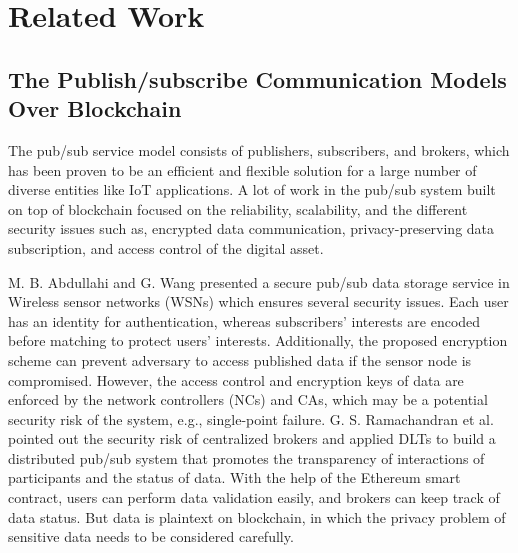 \newpage
{}
\chapter{Related Work}
\label{section:relatedWork}
\pagestyle{plain}

\begin{spacing}{2.0}

\section{The Publish/subscribe Communication Models Over Blockchain}
The pub/sub service model consists of publishers, subscribers, and brokers, which has been proven\cite{pubSubAnalysis, pubSubAnalysis2} to be an efficient and flexible solution for a large number of diverse entities like IoT applications. A lot of work in the pub/sub system built on top of blockchain focused on the reliability, scalability, and the different security issues such as, encrypted data communication, privacy-preserving data subscription, and access control of the digital asset.

M. B. Abdullahi and G. Wang\cite{centralPubSub} presented a secure pub/sub data storage service in Wireless sensor networks (WSNs) which ensures several security issues. Each user has an identity for authentication, whereas subscribers' interests are encoded before matching to protect users' interests. Additionally, the proposed encryption scheme can prevent adversary to access published data if the sensor node is compromised. However, the access control and encryption keys of data are enforced by the network controllers (NCs) and CAs, which may be a potential security risk of the system, e.g., single-point failure. G. S. Ramachandran et al.\cite{trinity} pointed out the security risk of centralized brokers and applied DLTs to build a distributed pub/sub system that promotes the transparency of interactions of participants and the status of data. With the help of the Ethereum smart contract, users can perform data validation easily, and brokers can keep track of data status. But data is plaintext on blockchain, in which the privacy problem of sensitive data needs to be considered carefully.


\end{spacing}
